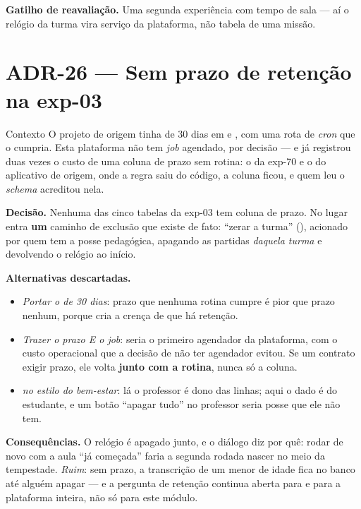 \textbf{Gatilho de reavaliação.} Uma segunda experiência com tempo de sala ---
aí o relógio da turma vira serviço da plataforma, não tabela de uma missão.

\section{ADR-26 --- Sem prazo de retenção na exp-03}
\label{adr:retencao-exp03}

\begin{especificacao}{Contexto}
O projeto de origem tinha  de 30 dias em  e
, com uma rota de \emph{cron} que o cumpria. Esta plataforma não tem
\emph{job} agendado, por decisão --- e já registrou duas vezes o custo de uma
coluna de prazo sem rotina: o  da exp-70 e o
 do aplicativo de origem, onde a regra saiu do
código, a coluna ficou, e quem leu o \emph{schema} acreditou nela.
\end{especificacao}

\textbf{Decisão.} Nenhuma das cinco tabelas da exp-03 tem coluna de prazo. No
lugar entra \textbf{um} caminho de exclusão que existe de fato: \enquote{zerar a
turma} (), acionado por quem tem
a posse pedagógica, apagando as partidas \emph{daquela turma} e devolvendo o
relógio ao início.

\textbf{Alternativas descartadas.}
\begin{itemize}
  \item \emph{Portar o  de 30 dias}: prazo que nenhuma rotina
    cumpre é pior que prazo nenhum, porque cria a crença de que há retenção.
  \item \emph{Trazer o prazo E o \emph{job}}: seria o primeiro agendador da
    plataforma, com o custo operacional que a decisão de não ter agendador
    evitou. Se um contrato exigir prazo, ele volta \textbf{junto com a rotina},
    nunca só a coluna.
  \item \emph{ no estilo do bem-estar}: lá o professor
    é dono das linhas; aqui o dado é do estudante, e um botão \enquote{apagar tudo} no
    professor seria posse que ele não tem.
\end{itemize}

\textbf{Consequências.} O relógio é apagado junto, e o diálogo diz por quê:
rodar de novo com a aula \enquote{já começada} faria a segunda rodada nascer no
meio da tempestade. \emph{Ruim}: sem prazo, a transcrição de um menor de idade
fica no banco até alguém apagar --- e a pergunta de retenção continua aberta para
 e para a plataforma inteira, não só para este módulo.

